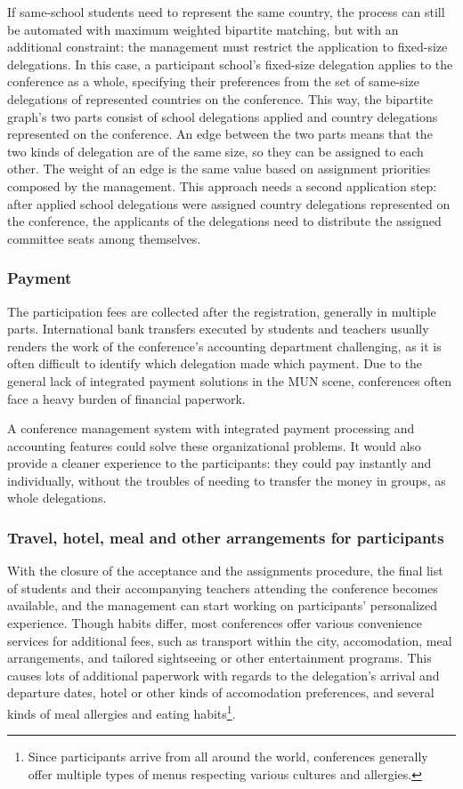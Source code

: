 If same-school students need to represent the same country, the process can still be automated with maximum weighted bipartite matching, but with an additional constraint: the management must restrict the application to fixed-size delegations. In this case, a participant school's fixed-size delegation applies to the conference as a whole, specifying their preferences from the set of same-size delegations of represented countries on the conference. This way, the bipartite graph's two parts consist of school delegations applied and country delegations represented on the conference. An edge between the two parts means that the two kinds of delegation are of the same size, so they can be assigned to each other. The weight of an edge is the same  value based on assignment priorities composed by the management. This approach needs a second application step: after applied school delegations were assigned country delegations represented on the conference, the applicants of the delegations need to distribute the assigned committee seats among themselves.

\subsubsection{Payment}

The participation fees are collected after the registration, generally in multiple parts. International bank transfers executed by students and teachers usually renders the work of the conference's accounting department challenging, as it is often difficult to identify which delegation made which payment. Due to the general lack of integrated payment solutions in the MUN scene, conferences often face a heavy burden of financial paperwork.

A conference management system with integrated payment processing and accounting features could solve these organizational problems. It would also provide a cleaner experience to the participants: they could pay instantly and individually, without the troubles of needing to transfer the money in groups, as whole delegations.

\subsubsection{Travel, hotel, meal and other arrangements for participants}

With the closure of the acceptance and the assignments procedure, the final list of students and their accompanying teachers attending the conference becomes available, and the management can start working on participants' personalized experience. Though habits differ, most conferences offer various convenience services for additional fees, such as transport within the city, accomodation, meal arrangements, and tailored sightseeing or other entertainment programs. This causes lots of additional paperwork with regards to the delegation's arrival and departure dates, hotel or other kinds of accomodation preferences, and several kinds of meal allergies and eating habits\footnote{Since participants arrive from all around the world, conferences generally offer multiple types of menus respecting various cultures and allergies.}.

